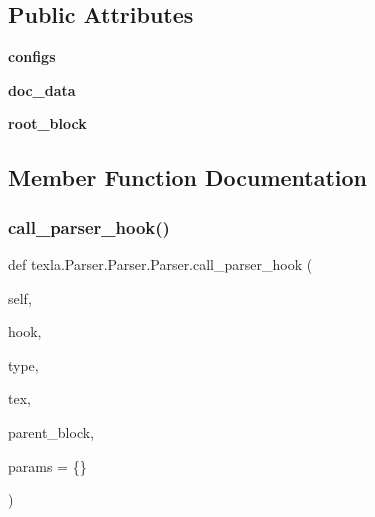 \subsection*{Public Attributes}
\begin{DoxyCompactItemize}
\item 
\hypertarget{classtexla_1_1Parser_1_1Parser_1_1Parser_ae261ebc4805082d9e913ac94fddbbf2c}{}\label{classtexla_1_1Parser_1_1Parser_1_1Parser_ae261ebc4805082d9e913ac94fddbbf2c} 
{\bfseries configs}
\item 
\hypertarget{classtexla_1_1Parser_1_1Parser_1_1Parser_a7b3170987364bf71a42581ff7d768002}{}\label{classtexla_1_1Parser_1_1Parser_1_1Parser_a7b3170987364bf71a42581ff7d768002} 
{\bfseries doc\+\_\+data}
\item 
\hypertarget{classtexla_1_1Parser_1_1Parser_1_1Parser_a64d8a35b7496d8dfd1046cd74ea91500}{}\label{classtexla_1_1Parser_1_1Parser_1_1Parser_a64d8a35b7496d8dfd1046cd74ea91500} 
{\bfseries root\+\_\+block}
\end{DoxyCompactItemize}


\subsection{Member Function Documentation}
\hypertarget{classtexla_1_1Parser_1_1Parser_1_1Parser_a7fa931c1a8b0b570977fb5c311ea9ec0}{}\label{classtexla_1_1Parser_1_1Parser_1_1Parser_a7fa931c1a8b0b570977fb5c311ea9ec0} 
\subsubsection{\texorpdfstring{call\+\_\+parser\+\_\+hook()}{call\_parser\_hook()}}
{\footnotesize\ttfamily def texla.\+Parser.\+Parser.\+Parser.\+call\+\_\+parser\+\_\+hook (\begin{DoxyParamCaption}\item[{}]{self,  }\item[{}]{hook,  }\item[{}]{type,  }\item[{}]{tex,  }\item[{}]{parent\+\_\+block,  }\item[{}]{params = {\ttfamily \{\}} }\end{DoxyParamCaption})}

